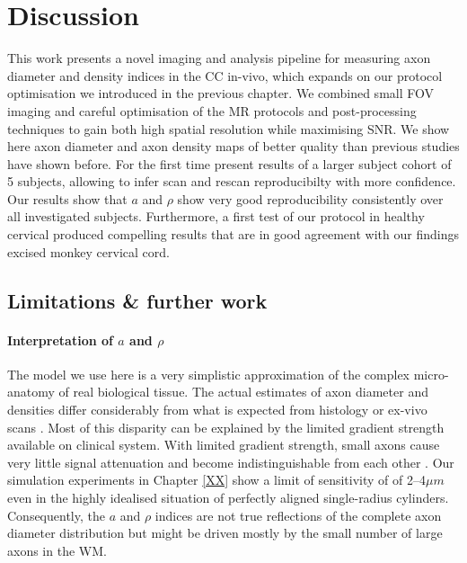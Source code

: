 \section{Discussion}
This work presents a novel imaging and analysis pipeline for measuring axon diameter and density indices in the CC in-vivo, which expands on our \SFasym{} protocol optimisation we introduced in the previous chapter. We combined small FOV imaging and careful optimisation of the MR protocols and post-processing techniques to gain both high spatial resolution while maximising SNR. We show here axon diameter and axon density maps of better quality than previous studies have shown before. For the first time present results of a larger subject cohort of 5 subjects, allowing to infer scan and rescan reproducibilty with more confidence. Our results show that $a$ and $\rho$ show very good reproducibility consistently over all investigated subjects. Furthermore, a first test of our protocol in healthy cervical produced compelling results that are in good agreement with our findings excised monkey cervical cord.

\subsection*{Limitations \& further work}
\paragraph{Interpretation of $a$ and $\rho$}The model we use here is a very simplistic approximation of the complex micro-anatomy of real biological tissue. The actual estimates of axon diameter and densities differ considerably from what is expected from histology or ex-vivo scans \citep{Alexander:2010}. Most of this disparity can be explained by the limited gradient strength available on clinical system.  With limited gradient strength, small axons cause very little signal attenuation and become indistinguishable from each other \citep{Yeh:XXXX, Latt:YYYY}. Our simulation experiments in Chapter \ref{XX} show a limit of sensitivity of of 2--4$\mu m$ even in the highly idealised situation of perfectly aligned single-radius cylinders. Consequently, the $a$ and $\rho$ indices are not true reflections of the complete axon diameter distribution but might be driven mostly by the small number of large axons in the WM. 

